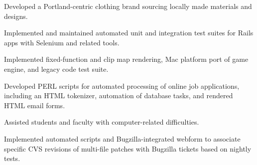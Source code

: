 \documentclass[]{jhearn-resume}
\begin{document}
\begin{minipage}[t]{0.64\textwidth}
\begin{tightemize}
\item Developed a Portland-centric clothing brand sourcing locally made materials and designs.
\end{tightemize}
\sectionsep

\begin{tightemize}
\item Implemented and maintained automated unit and integration test suites for Rails apps with Selenium and related tools.
\end{tightemize}
\sectionsep

\begin{tightemize}
\item Implemented fixed-function and clip map rendering, Mac platform port of game engine, and legacy code test suite.
\end{tightemize}
\sectionsep

\begin{tightemize}
\item Developed PERL scripts for automated processing of online job applications, including an HTML tokenizer, automation of database tasks, and rendered HTML email forms.
\item Assisted students and faculty with computer-related difficulties.
\end{tightemize}
\sectionsep

\begin{tightemize}
\item Implemented automated scripts and Bugzilla-integrated webform to
associate specific CVS revisions of multi-file patches with Bugzilla tickets based on nightly tests.
\end{tightemize}
\sectionsep

\end{minipage}
\hfill
\end{document}
